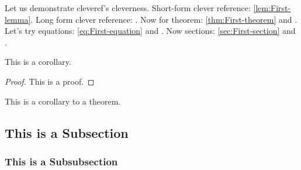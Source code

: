 \documentclass{article}
\begin{document}
Let us demonstrate cleveref's cleverness. Short-form clever reference: \cref{lem:First-lemma}. Long form clever reference: . Now for theorem: \cref{thm:First-theorem} and . Let's try equations: \cref{eq:First-equation} and . Now sections: \cref{sec:First-section} and .

\begin{cor}\label{cor:First-corollary}
This is a corollary.

\end{cor}

\begin{proof}
This is a proof.
%
\end{proof}

\begin{cor}
This is a corollary to a theorem.
%
\end{cor}

\lipsum[1-5]

\subsection{This is a Subsection}

\lipsum[6-10]

\subsubsection{This is a Subsubsection}
\lipsum[11-20]

\nocite{*}
\printbibliography




\end{document}
